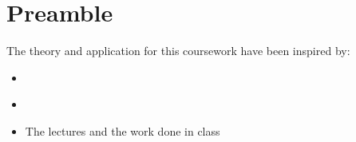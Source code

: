 \chapter{Preamble}
The theory and application for this coursework have been inspired by:
\begin{itemize}
    \item \cite{spiralModelSoftDev}
    \item \cite{softEng}
    \item The lectures and the work done in class
\end{itemize}